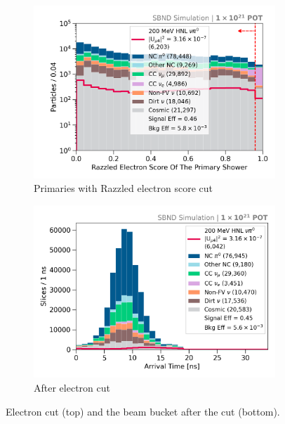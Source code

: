 \begin{figure}[b!]
        \begin{subfigure}[b]{0.495\textwidth}   
            \centering 
            \includegraphics[width=\textwidth]{razzled_electron_score_prim_shw_precut}
            \caption{Primaries with Razzled electron score cut}%
            \label{fig:nrazzled_electron_full}
        \end{subfigure}
        \hfill
        \begin{subfigure}[b]{0.495\textwidth}   
            \centering 
            \includegraphics[width=\textwidth]{beam_bucket_postelectron}
            \caption{After electron cut}%
            \label{fig:bb_post_electron}
        \end{subfigure}
	\caption[Electron Cut]{
		Electron cut (top) and the beam bucket after the cut (bottom). 
	}
        \label{fig:razzled_electron_cut}
\end{figure}

